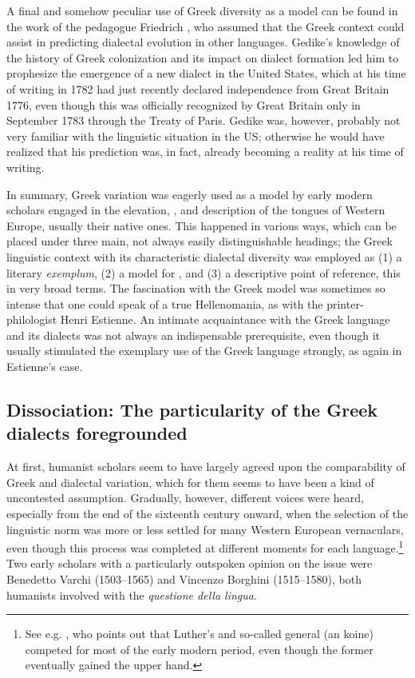 A final and somehow peculiar use of Greek diversity as a model can be found in the work of the  pedagogue Friedrich \citet[7]{Gedike1782}, who assumed that the Greek context could assist in predicting dialectal evolution in other languages. Gedike’s knowledge of the history of Greek colonization and its impact on dialect formation led him to prophesize the emergence of a new  dialect in the United States, which at his time of writing in 1782 had just recently declared independence from Great Britain 1776, even though this was officially recognized by Great Britain only in September 1783 through the Treaty of Paris. Gedike was, however, probably not very familiar with the linguistic situation in the US; otherwise he would have realized that his prediction was, in fact, already becoming a reality at his time of writing.

In summary, Greek variation was eagerly used as a model by early modern scholars engaged in the elevation, , and description of the  tongues of Western Europe, usually their native ones. This happened in various ways, which can be placed under three main, not always easily distinguishable headings; the Greek linguistic context with its characteristic dialectal diversity was employed as (1) a literary \textit{exemplum}, (2) a model for , and (3) a descriptive point of reference, this in very broad terms. The fascination with the Greek model was sometimes so intense that one could speak of a true Hellenomania, as with the printer-philologist Henri Estienne. An intimate acquaintance with the Greek language and its dialects was not always an indispensable prerequisite, even though it usually stimulated the exemplary use of the Greek language strongly, as again in Estienne’s case.

\subsection{Dissociation: The particularity of the Greek dialects foregrounded}\label{sec:8.1.3}

At first, humanist scholars seem to have largely agreed upon the comparability of Greek and  dialectal variation, which for them seems to have been a kind of uncontested assumption. Gradually, however, different voices were heard, especially from the end of the sixteenth century onward, when the selection of the linguistic norm was more or less settled for many Western European vernaculars, even though this process was completed at different moments for each language.\footnote{See e.g. \citet[217--222]{Mattheier2003}, who points out that Luther’s  and so-called general  (an  koine) competed for most of the early modern period, even though the former eventually gained the upper hand.} Two early scholars with a particularly outspoken opinion on the issue were Benedetto Varchi (1503–1565) and Vincenzo Borghini (1515–1580), both  humanists involved with the \textit{questione della lingua}.

